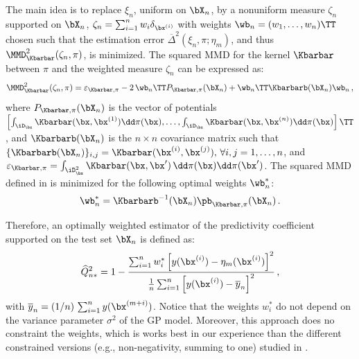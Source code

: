 The main idea is to replace $\xi_n$, uniform on $\bX_n$, by a nonuniform measure $\zeta_n$ supported on $\bX_n$, $\zeta_n = \sum_{i=1}^n w_i \delta_{\bx^{(i)}}$ with weights $\wb_n = (w_1,\ldots,w_n)\TT$ chosen such that the estimation error $\overline{\Delta}^2(\xi_n,\pi;\eta_m)$, and thus $\MMD_{\Kbarbar}^2(\zeta_n,\pi)$, is minimized. 
The squared MMD for the kernel $\Kbarbar$ between $\pi$ and the weighted measure $\zeta_n$ can be expressed as:  
\begin{equation}
    \MMD_{\Kbarbar}^2(\zeta_n,\pi) = \varepsilon_{\Kbarbar, \pi} - 2\,\wb_n\TT P_{\Kbarbar, \pi}(\bX_n) + \wb_n\TT\Kbarbarb(\bX_n)\wb_n \,,
    \label{eq:mmd2_validation}
\end{equation}
where $P_{\Kbarbar, \pi}(\bX_n)$ is the vector of potentials $\left[\int_{\iD_\bx} \Kbarbar(\bx, \bx^{(1)}) \dd \pi(\bx), \dots, \int_{\iD_\bx} \Kbarbar(\bx, \bx^{(n)}) \dd \pi(\bx)\right]\TT$, 
and $\Kbarbarb(\bX_n)$ is the $n \times n$ covariance matrix such that $\{\Kbarbarb(\bX_n)\}_{i,j}=\Kbarbar(\bx^{(i)},\bx^{(j)}), \, \forall i,j=1,\ldots,n$, 
and $\varepsilon_{\Kbarbar, \pi}=\int_{\iD_\bx^2} \Kbarbar(\bx,\bx')\,\dd\pi(\bx)\dd\pi(\bx')$.
%
The squared MMD defined in  is minimized for the following optimal weights $\wb_n^*$: 
\begin{equation}
    \label{Eq:weights}
    \wb_n^* = \Kbarbarb^{-1}(\bX_n)\pb_{\Kbarbar, \pi}(\bX_n) \,.
\end{equation}

Therefore, an optimally weighted estimator of the predictivity coefficient supported on the test set $\bX_n$ is defined as: 
\begin{equation}
    \widehat Q_{n*}^2 = 1 - \frac{\sum_{i=1}^n w_i^* \left[ y(\bx^{(i)})-\eta_m(\bx^{(i)})\right]^2}{\frac1n \sum_{i=1}^n \left[y(\bx^{(i)})-\overline{y}_n\right]^2} \,,
    \label{Q2-est*}
\end{equation}
with $\overline{y}_n=(1/n)\,\sum_{i=1}^n y(\bx^{(m+i)})$.
Notice that the weights $w_i^*$ do not depend on the variance parameter $\sigma^2$ of the GP model. 
Moreover, this approach does no constraint the weights, which is works best in our experience than the different constrained versions (e.g., non-negativity, summing to one) studied in \citet{PR2021a}. 

